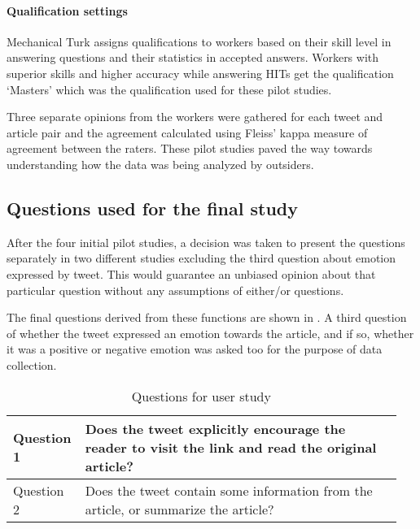 

\paragraph{Qualification settings} Mechanical Turk assigns qualifications to workers based on their skill level in answering questions and their statistics in accepted answers. Workers with superior skills and higher accuracy while answering HITs get the qualification `Masters' which was the qualification used for these pilot studies.

Three separate opinions from the workers were gathered for each tweet and article pair and the agreement calculated using Fleiss' kappa measure  of agreement \citep{geertzen2012inter} between the raters. These pilot studies paved the way towards understanding how the data was being analyzed by outsiders. 
 
 


\subsection{Questions used for the final study}

After the four initial pilot studies, a decision was taken to present the questions separately in two different studies excluding the third question about emotion expressed by tweet. This would guarantee an unbiased opinion about that particular question without any assumptions of either/or questions.

The final questions derived from these functions are shown in . A third question of whether the tweet expressed an emotion towards the article, and if so, whether it was a positive or negative emotion was asked too for the purpose of data collection. 

\begin{table}[!htbp]
\centering
\begin{tabular}{|p{0.15\linewidth}|p{0.8\linewidth}|}
\hline
Question 1 & Does the tweet explicitly encourage the reader to visit the link and read the original article? \\ \hline
Question 2 & Does the tweet contain some information from the article, or summarize the article?             \\ \hline
\end{tabular}
\caption{Questions for user study}
\label{tab:mturkqs}
\end{table} 

